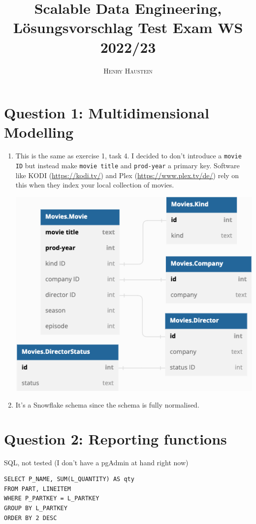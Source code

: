 \documentclass{article}
\title{\textbf{Scalable Data Engineering, Lösungsvorschlag Test Exam WS 2022/23}}
\author{\textsc{Henry Haustein}}
\date{}
\begin{document}
	\maketitle
	
	\section*{Question 1: Multidimensional Modelling}
	\begin{enumerate}[label=(\alph*)]
		\item This is the same as exercise 1, task 4. I decided to don't introduce a \texttt{movie ID} but instead make \texttt{movie title} and \texttt{prod-year} a primary key. Software like KODI (\url{https://kodi.tv/}) and Plex (\url{https://www.plex.tv/de/}) rely on this when they index your local collection of movies.
		\begin{center}
			\includegraphics[scale=0.5]{Test Exam Q1}
		\end{center}
		\item It's a Snowflake schema since the schema is fully normalised.
	\end{enumerate}

	\section*{Question 2: Reporting functions}
	SQL, not tested (I don't have a pgAdmin at hand right now)
	\begin{lstlisting}[tabsize=2]
SELECT P_NAME, SUM(L_QUANTITY) AS qty
FROM PART, LINEITEM
WHERE P_PARTKEY = L_PARTKEY
GROUP BY L_PARTKEY
ORDER BY 2 DESC
	\end{lstlisting}
\end{document}
